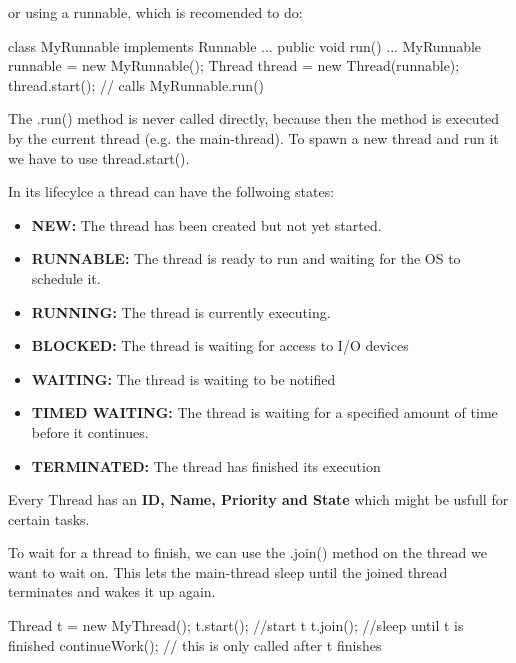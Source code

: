 or using a runnable, which is recomended to do:

\begin{codeexample}
class MyRunnable implements Runnable { ...
    public void run() {
        ...
    }
}
MyRunnable runnable = new MyRunnable();
Thread thread = new Thread(runnable);
thread.start(); // calls MyRunnable.run()
\end{codeexample}

\begin{remark}
The .run() method is never called directly, because then the method is executed by the current thread (e.g. the main-thread). To spawn a new thread and run it we have to use thread.start().
\end{remark}

In its lifecylce a thread can have the follwoing states:
\begin{itemize}
    \item \textbf{NEW: }The thread has been created but not yet started.
    \item \textbf{RUNNABLE: }The thread is ready to run and waiting for the OS to schedule it.
    \item \textbf{RUNNING: }The thread is currently executing.
    \item \textbf{BLOCKED: }The thread is waiting for access to I/O devices
    \item \textbf{WAITING: }The thread is waiting to be notified
    \item \textbf{TIMED WAITING: }The thread is waiting for a specified amount of time before it continues.
    \item \textbf{TERMINATED: }The thread has finished its execution
\end{itemize}

\begin{remark}
Every Thread has an \textbf{ID, Name, Priority and State} which might be usfull for certain tasks.            
\end{remark}

To wait for a thread to finish, we can use the .join() method on the thread we want to wait on. This lets
the main-thread sleep until the joined thread terminates and wakes it up again.

\begin{codeexample}
Thread t = new MyThread();
t.start(); //start t
t.join(); //sleep until t is finished
continueWork(); // this is only called after t finishes
\end{codeexample}

